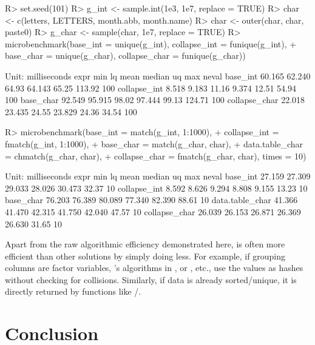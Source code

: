 \documentclass[article]{jss}
\begin{document}
\begin{Schunk}
\begin{Sinput}
R> set.seed(101)
R> g_int <- sample.int(1e3, 1e7, replace = TRUE)
R> char <- c(letters, LETTERS, month.abb, month.name)
R> char <- outer(char, char, paste0)
R> g_char <- sample(char, 1e7, replace = TRUE)
R> microbenchmark(base_int = unique(g_int), collapse_int = funique(g_int),
+              base_char = unique(g_char), collapse_char = funique(g_char))
\end{Sinput}
\begin{Soutput}
Unit: milliseconds
          expr    min     lq  mean median    uq    max neval
      base_int 60.165 62.240 64.93 64.143 65.25 113.92   100
  collapse_int  8.518  9.183 11.16  9.374 12.51  54.94   100
     base_char 92.549 95.915 98.02 97.444 99.13 124.71   100
 collapse_char 22.018 23.435 24.55 23.829 24.36  34.54   100
\end{Soutput}
\begin{Sinput}
R> microbenchmark(base_int = match(g_int, 1:1000),
+                 collapse_int = fmatch(g_int, 1:1000),
+                 base_char = match(g_char, char),
+                 data.table_char = chmatch(g_char, char),
+                 collapse_char = fmatch(g_char, char), times = 10)
\end{Sinput}
\begin{Soutput}
Unit: milliseconds
            expr    min     lq   mean median     uq   max neval
        base_int 27.159 27.309 29.033 28.026 30.473 32.37    10
    collapse_int  8.592  8.626  9.294  8.808  9.155 13.23    10
       base_char 76.203 76.389 80.089 77.340 82.390 88.61    10
 data.table_char 41.366 41.470 42.315 41.750 42.040 47.57    10
   collapse_char 26.039 26.153 26.871 26.369 26.630 31.65    10
\end{Soutput}
\end{Schunk}
%
Apart from the raw algorithmic efficiency demonstrated here,  is often more efficient than other solutions by simply doing less. For example, if grouping columns are factor variables, 's algorithms in ,  or , etc., use the values as hashes without checking for collisions. Similarly, if data is already sorted/unique, it is directly returned by functions like /.

\newpage

\section{Conclusion} \label{sec:conclusion}
\end{document}
